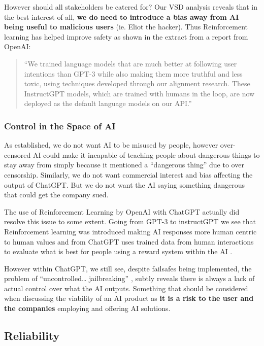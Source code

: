 However should all stakeholders be catered for? Our VSD analysis reveals that in the best interest of all, \textbf{we do need to introduce a bias away from AI being useful to malicious users} (ie. Eliot the hacker). Thus Reinforcement learning has helped improve safety as shown in the extract from a report from OpenAI:
\begin{quote}
``We trained language models that are much better at following user intentions than GPT‑3 while also making them more truthful and less toxic, using techniques developed through our alignment research. These InstructGPT models, which are trained with humans in the loop, are now deployed as the default language models on our API.''
\end{quote}

\begin{flushright}
\cite{Ouyang2022}
\end{flushright}

\subsubsection{Control in the Space of AI}

As established, we do not want AI to be misused by people, however over-censored AI could make it incapable of teaching people about dangerous things to stay away from simply because it mentioned a “dangerous thing” due to over censorship. Similarly, we do not want commercial interest and bias affecting the output of ChatGPT. But we do not want the AI saying something dangerous that could get the company sued.

The use of Reinforcement Learning by OpenAI with ChatGPT actually did resolve this issue to some extent. Going from GPT-3 to instructGPT we see that Reinforcement learning was introduced making AI responses more human centric to human values and from ChatGPT uses trained data from human interactions to evaluate what is best for people using a reward system within the AI \parencite{Ray2023}.

However within ChatGPT, we still see, despite failsafes being implemented, the problem of ``uncontrolled… jailbreaking'' \parencite{Boxleitner2023}, subtly reveals there is always a lack of actual control over what the AI outputs. Something that should be considered when discussing the viability of an AI product as \textbf{it is a risk to the user and the companies} employing and offering AI solutions.

\subsection{Reliability}

